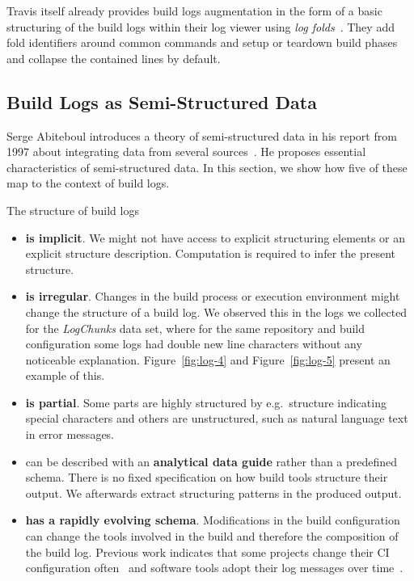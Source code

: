 \documentclass[\myrootdir/main.tex]{subfiles}
\begin{document}
Travis itself already provides build logs augmentation in the form of a basic structuring of the build logs within their log viewer using \emph{log folds}~\cite{travis2019logfolds}.
They add fold identifiers around common commands and setup or teardown build phases and collapse the contained lines by default.

\subsection{Build Logs as Semi-Structured Data}
\label{sec:rw-semi-structured-data}
Serge Abiteboul introduces a theory of semi-structured data in his report from 1997 about integrating data from several sources~\cite{abiteboul1997querying}.
He proposes essential characteristics of semi-structured data.
In this section, we show how five of these map to the context of build logs.

The structure of build logs
\begin{itemize}
  \item \textbf{is implicit}.
  We might not have access to explicit structuring elements or an explicit structure description.
  Computation is required to infer the present structure.
  \item \textbf{is irregular}.
  Changes in the build process or execution environment might change the structure of a build log.
  We observed this in the logs we collected for the \emph{LogChunks} data set, where for the same repository and build configuration some logs had double new line characters without any noticeable explanation.
  Figure~\ref{fig:log-4} and Figure~\ref{fig:log-5} present an example of this.
  \item \textbf{is partial}. Some parts are highly structured by e.g.\ structure indicating special characters and others are unstructured, such as natural language text in error messages.
  \item can be described with an \textbf{analytical data guide} rather than a predefined schema.
  There is no fixed specification on how build tools structure their output.
  We afterwards extract structuring patterns in the produced output.
  \item \textbf{has a rapidly evolving schema}.
  Modifications in the build configuration can change the tools involved in the build and therefore the composition of the build log.
  Previous work indicates that some projects change their CI configuration often~\cite{hilton2016usage} and software tools adopt their log messages over time~\cite{yuan2012characterizing}.
\end{itemize}
\end{document}
